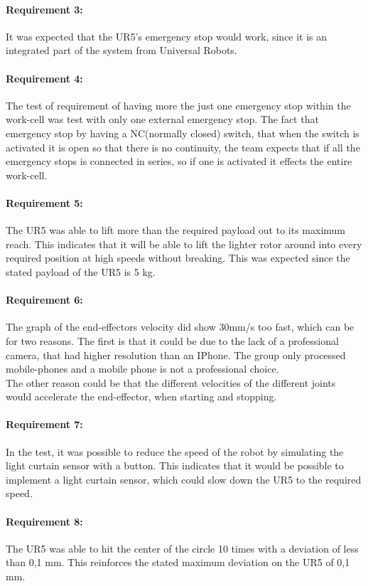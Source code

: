 \paragraph{Requirement 3:}
It was expected that the UR5's emergency stop would work, since it is an integrated part of the system from Universal Robots. 

\paragraph{Requirement 4:}

The test of requirement of having more the just one emergency stop within the work-cell was test with only one external emergency stop. The fact that emergency stop by having a NC(normally closed) switch, that when the switch is activated it is open so that there is no continuity, the team expects that if all the emergency stops is connected in series, so if one is activated it effects the entire work-cell.  

\paragraph{Requirement 5:}
The UR5 was able to lift more than the required payload out to its maximum reach. This indicates that it will be able to lift the lighter rotor around into every required position at high speeds without breaking. This was expected since the stated payload of the UR5 is 5 kg. 


\paragraph{Requirement 6:}
The graph of the end-effectors velocity did show 30mm/s too fast, which can be for  two reasons. The first is that it could be due to the lack of a professional camera, that had higher resolution than an IPhone. The group only processed mobile-phones and a mobile phone is not a professional choice.\\
The other reason could be that the different velocities of the different joints would accelerate the end-effector, when starting and stopping. 


\paragraph{Requirement 7:}
In the test, it was possible to reduce the speed of the robot by simulating the light curtain sensor with a button. This indicates that it would be possible to implement a light curtain sensor, which could slow down the UR5 to the required speed. 


\paragraph{Requirement 8:}
The UR5 was able to hit the center of the circle 10 times with a deviation of less than 0,1 mm. This reinforces the stated maximum deviation on the UR5 of 0,1 mm. 
 

 